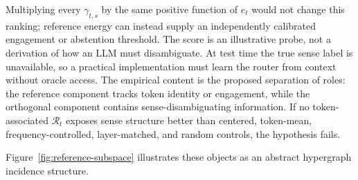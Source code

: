 \documentclass[
  aps,
  reprint,
  superscriptaddress,
  floatfix,
  nofootinbib,
  longbibliography
]{revtex4-2}
\begin{document}
%
Multiplying every $\gamma_{t,s}$ by the same positive function of $e_t$ would not
change this ranking; reference energy can instead supply an independently
calibrated engagement or abstention threshold.  The score is an illustrative
probe, not a derivation of how an LLM
must disambiguate.  At test time the true sense label is unavailable, so a
practical implementation must learn the router from context without oracle
access.  The empirical content is the proposed separation of roles: the
reference component tracks token identity or engagement, while the orthogonal
component contains sense-disambiguating information. If no token-associated
$\mathcal R_t$ exposes sense structure better than centered, token-mean,
frequency-controlled, layer-matched, and random controls, the hypothesis
fails.

Figure~\ref{fig:reference-subspace} illustrates these objects as an abstract
hypergraph incidence structure.
\end{document}
